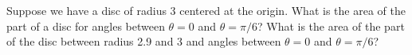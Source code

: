 Suppose we have a disc of radius 3 centered at the origin.  What is the area of the part of a disc for angles between $\theta=0$ and $\theta=\pi/6$?  What is the area of the part of the disc between radius 2.9 and 3 and angles between $\theta=0$ and $\theta=\pi/6$?